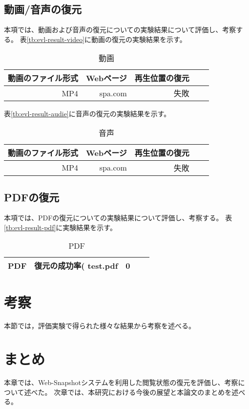 \subsection{動画/音声の復元}
本項では、動画および音声の復元についての実験結果について評価し、考察する。
表\ref{tb:evl-result-video}に動画の復元の実験結果を示す。

\begin{table}[htbp]
  \caption{動画}
  \label{tab:evl-result-video}
  \begin{center}
    \begin{tabular}{rrrrr}
      \hline
      動画のファイル形式 & Webページ & 再生位置の復元 \\ \hline \hline
      MP4 & spa.com & 失敗  \\ \hline
    \end{tabular}
  \end{center}
\end{table}

表\ref{tb:evl-result-audie}に音声の復元の実験結果を示す。

\begin{table}[htbp]
  \caption{音声}
  \label{tab:evl-result-audio}
  \begin{center}
    \begin{tabular}{rrrrr}
      \hline
      動画のファイル形式 & Webページ & 再生位置の復元 \\ \hline \hline
      MP4 & spa.com & 失敗  \\ \hline
    \end{tabular}
  \end{center}
\end{table}

\subsection{PDFの復元}
本項では、PDFの復元についての実験結果について評価し、考察する。
表\ref{tb:evl-result-pdf}に実験結果を示す。

\begin{table}[htbp]
  \caption{PDF}
  \label{tab:evl-result-video}
  \begin{center}
    \begin{tabular}{rrrrr}
      \hline
      PDF  & 復元の成功率(%
      test.pdf  & 0  \\ \hline
    \end{tabular}
  \end{center}
\end{table}

\section{考察}
本節では，評価実験で得られた様々な結果から考察を述べる。

\section{まとめ}
本章では、Web-Snapshotシステムを利用した閲覧状態の復元を評価し、考察について述べた。
次章では、本研究における今後の展望と本論文のまとめを述べる。